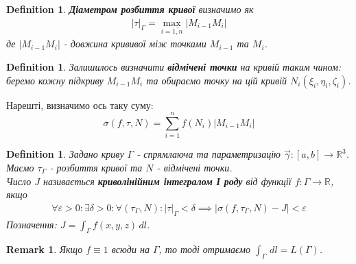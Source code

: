 \documentclass[a4paper, 10pt]{article}
\def\huge{\displaystyle}
\theoremstyle{theoremdd}
\theoremstyle{theoremdd}
\newtheorem{definition}[theorem]{Definition}
\theoremstyle{theoremdd}
\theoremstyle{theoremdd}
\theoremstyle{theoremdd}
\theoremstyle{theoremdd}
\theoremstyle{theoremdd}
\theoremstyle{theoremdd}
\theoremstyle{theoremdd}
\theoremstyle{theoremdd}
\theoremstyle{theoremdd}
\newtheorem{remark}[theorem]{Remark}
\theoremstyle{theoremdd}
\theoremstyle{theoremdd}
\theoremstyle{theoremdd}
\theoremstyle{theoremdd}
\newcommand\Norm[1]{\left\lVert#1\right\rVert}
\begin{document}
\begin{definition}
\textbf{Діаметром розбиття кривої} визначимо як
\begin{align*}
| \tau |_\Gamma = \max_{i = \overline{1,n}} |M_{i-1}M_{i}|
\end{align*}
де $|M_{i-1}M_i|$ - довжина крививої між точками $M_{i-1}$ та $M_i$.
\end{definition}

\begin{definition}
Залишилось визначити \textbf{відмічені точки} на кривій таким чином: беремо кожну підкриву $M_{i-1}M_i$ та обираємо точку на цій кривій $N_i(\xi_i,\eta_i,\zeta_i)$.
\end{definition}

Нарешті, визначимо ось таку суму:
$$ \sigma(f,\tau,N) = \displaystyle\sum_{i=1}^n f(N_i) |M_{i-1}M_i|$$

\begin{definition}
Задано криву $\Gamma$ - спрямлаюча та параметризацію $\vec{\gamma}: [a,b] \to \mathbb{R}^3$. Маємо $\tau_\Gamma$ - розбиття кривої та $N$ - відмічені точки.\\
Число $J$ називається \textbf{криволінійним інтегралом І роду} від функції $f: \Gamma \to \mathbb{R}$, якщо
\begin{align*}
\forall \varepsilon > 0: \exists \delta > 0: \forall (\tau_\Gamma, N): |\tau|_\Gamma < \delta \implies |\sigma(f,\tau_\Gamma,N) - J| < \varepsilon
\end{align*}
Позначення: $J = \displaystyle\int_\Gamma f(x,y,z)\,dl$.
\end{definition}

\iffalse
\begin{definition}
Задано функцію $\vec{\gamma}: [a,b] \to \mathbb{R}^3$. Нехай крива $\Gamma = \vec{\gamma}([a,b])$ - неособлива та гладка.\\
Число $J$ називається \textbf{криволінійним інтегралом I роду} від функції $f: \Gamma \to \mathbb{R}$ вздовж кривої $\Gamma$, якщо
\begin{align*}
\forall \varepsilon > 0: \exists \delta > 0: \forall (\tau,\xi): |\tau| < \delta \implies |\sigma(\tau,\xi,(f \circ \gamma \cdot \Norm{\vec{\gamma}'})) - J| < \varepsilon
\end{align*}
Позначення: $J = \huge\int_\Gamma f(x,y,z)\,dl$
\end{definition}
\fi

\begin{remark}
Якщо $f \equiv 1$ всюди на $\Gamma$, то тоді отримаємо $\displaystyle\int_\Gamma \,dl = L(\Gamma)$.
\end{remark}
\end{document}
